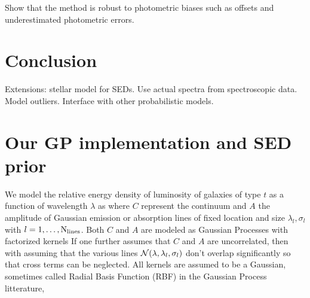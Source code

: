 \documentclass[aps,prd,showpacs,superscriptaddress,groupedaddress]{revtex4}  %
\begin{document}
Show that the method is robust to photometric biases such as offsets and underestimated photometric errors. 



\section{Conclusion}
Extensions: stellar model for SEDs. Use actual spectra from spectroscopic data. Model outliers. Interface with other probabilistic models.


\footnotesize{
  
\providecommand{\eprint}[1]{\href{http://arxiv.org/abs/#1}{arXiv:#1}}	
  
}
\normalsize


\appendix
\section{Our GP implementation and SED prior}

We model the relative energy density of luminosity of galaxies of type $t$ as a function of wavelength $\lambda$ as
where $C$ represent the continuum and $A$ the amplitude of Gaussian emission or absorption lines of fixed location and size $ \lambda_l, \sigma_l$ with $l = 1, \ldots, {\rm N}_{\rm lines}$. Both $C$ and $A$ are modeled as Gaussian Processes with factorized kernels
If one further assumes that $C$ and $A$ are uncorrelated, then 
with 
assuming that the various lines $\mathcal{N}(\lambda, \lambda_l, \sigma_l)$ don't overlap significantly so that cross terms can be neglected. All kernels are assumed to be a Gaussian, sometimes called Radial Basis Function (RBF) in the Gaussian Process litterature,
\end{document}
